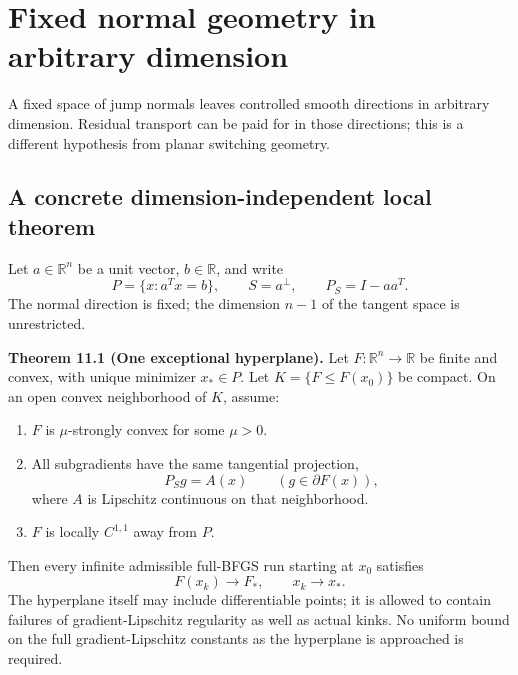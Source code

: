 \chapter{Fixed normal geometry in arbitrary dimension}\label{comp:U}\label{U:chapter}
\renewcommand{\ModuleTag}{11}
A fixed space of jump normals leaves controlled smooth directions in arbitrary dimension. Residual transport can be paid for in those directions; this is a different hypothesis from planar switching geometry.


\begingroup

\setcounter{section}{0}
\setcounter{theorem}{0}
\setcounter{lemma}{0}
\setcounter{corollary}{0}
\setcounter{proposition}{0}
\setcounter{remark}{0}
\setcounter{equation}{0}


\section{A concrete dimension-independent local
theorem}\label{U:a-concrete-dimension-independent-local-theorem}


Let \(a\in\mathbb R^n\) be a unit vector, \(b\in\mathbb R\), and write
\[
 P=\{x:a^Tx=b\},\qquad S=a^\perp,\qquad P_S=I-aa^T.
\] The normal direction is fixed; the dimension \(n-1\) of the tangent
space is unrestricted.

\label{U:one}\textbf{Theorem 11.1 (One exceptional hyperplane).} Let
\(F:\mathbb R^n\to\mathbb R\) be finite and convex, with unique
minimizer \(x_*\in P\). Let \(K=\{F\le F(x_0)\}\) be compact. On an open
convex neighborhood of \(K\), assume:

\begin{enumerate}
\def\labelenumi{\arabic{enumi}.}
\tightlist
\item
  \(F\) is \(\mu\)-strongly convex for some \(\mu>0\).
\item
  All subgradients have the same tangential projection,
  \[P_Sg=A(x)\qquad(g\in\partial F(x)),\] where \(A\) is Lipschitz
  continuous on that neighborhood.
\item
  \(F\) is locally \(C^{1,1}\) away from \(P\).
\end{enumerate}

Then every infinite admissible full-BFGS run starting at \(x_0\)
satisfies \[
 \boxed{F(x_k)\to F_*,\qquad x_k\to x_*.}
\] The hyperplane itself may include differentiable points; it is
allowed to contain failures of gradient-Lipschitz regularity as well as
actual kinks. No uniform bound on the full gradient-Lipschitz constants
as the hyperplane is approached is required.


